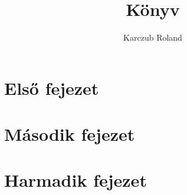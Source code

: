 \documentclass{book}
\begin{document}
    \frontmatter
        \title{Könyv}
        \author{Karczub Roland}
        \maketitle
    
        \tableofcontents
    
    \mainmatter
        \chapter{Első fejezet}
            \cite{abrharber03}
            \lipsum[2-7]
            \cite{knuth84}
        \chapter{Második fejezet}
            \lipsum[3-5]
        \chapter{Harmadik fejezet}
            \lipsum[1]
            \cite{g4gbin}
            \lipsum[8]
            
    \backmatter
        
        
    
\end{document}
